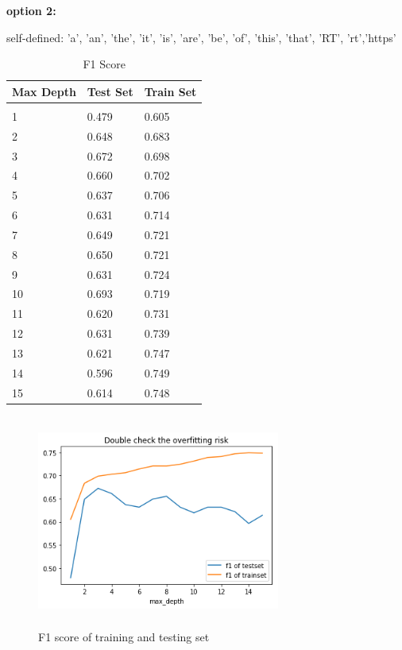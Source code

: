 \documentclass{article} %
\begin{document}
\textbf{option 2: }

self-defined: {'a', 'an', 'the', 'it', 'is', 'are', 'be', 'of', 'this', 'that', 'RT', 'rt','https'}


\begin{table}[H]
	\caption{F1 Score}
	\label{sample-table}
	\begin{center}
		\begin{tabular}{|l|l|l|}
			\multicolumn{1}{c}{\bf Max Depth}  
			&\multicolumn{1}{c}{\bf Test Set}
			&\multicolumn{1}{c}{\bf Train Set}
			\\ \hline & &  \\
			1        &0.479 &0.605	 \\
			2        &0.648	&0.683	  \\
			3        &0.672	&0.698	 \\
			4        &0.660	&0.702	 \\
			5        &0.637	&0.706 \\
			6        &0.631 &0.714   \\
			7        &0.649 &0.721   \\
			8        &0.650 &0.721   \\
			9        &0.631 &0.724    \\
			10       &0.693  &0.719    \\
			11       &0.620  &0.731   \\
			12       &0.631 &0.739  \\
			13       &0.621 &0.747  \\
			14       &0.596 &0.749  \\
			15       &0.614 &0.748  \\
			\hline
		\end{tabular}
	\end{center}
\end{table}


\begin{figure}[H]
	\centering
	\includegraphics[height=7cm, width=8cm]{3.png}
	\caption{F1 score of training and testing set}
\end{figure}
\end{document}
